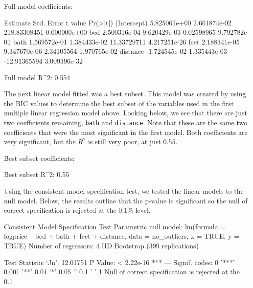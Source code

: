 \documentclass[11pt, a4paper]{article}
\begin{document}
\begin{Schunk}
\begin{Soutput}
Full model coefficients:
\end{Soutput}
\begin{Soutput}
                 Estimate   Std. Error      t value     Pr(>|t|)
(Intercept)  5.825061e+00 2.661874e-02 218.83308451 0.000000e+00
bed          2.500316e-04 9.620429e-03   0.02598965 9.792782e-01
bath         1.569572e-01 1.384433e-02  11.33729711 4.217251e-26
feet         2.188341e-05 9.347670e-06   2.34105564 1.970765e-02
distance    -1.724545e-02 1.335443e-03 -12.91365594 3.009396e-32
\end{Soutput}
\begin{Soutput}
Full model R^2: 0.554
\end{Soutput}
\end{Schunk}

The next linear model fitted was a best subset. This model was created by using the BIC values to determine the best subset of the variables used in the first multiple linear regression model above. Looking below, we see that there are just two coefficients remaining, \texttt{bath} and \texttt{distance}. Note that these are the same two coefficients that were the most significant in the first model. Both coefficients are very significant, but the $R^2$ is still very poor, at just 0.55.

\begin{Schunk}
\begin{Soutput}
Best subset coefficients:
\end{Soutput}
\begin{Soutput}
Best subset R^2: 0.55
\end{Soutput}
\end{Schunk}

Using the consistent model specification test, we tested the linear models to the null model. Below, the results outline that the p-value is significant so the null of correct specification is rejected at the 0.1\% level.


\begin{Schunk}
\begin{Soutput}
Consistent Model Specification Test
Parametric null model: lm(formula = logprice ~ bed + bath + feet + distance,
                          data = no_outliers, x = TRUE, y = TRUE)
Number of regressors: 4
IID Bootstrap (399 replications)

Test Statistic ‘Jn’: 12.01751	P Value: < 2.22e-16 ***
---
Signif. codes:  0 '***' 0.001 '**' 0.01 '*' 0.05 '.' 0.1 ' ' 1
Null of correct specification is rejected at the 0.1%
\end{Soutput}
\end{Schunk}
\end{document}
